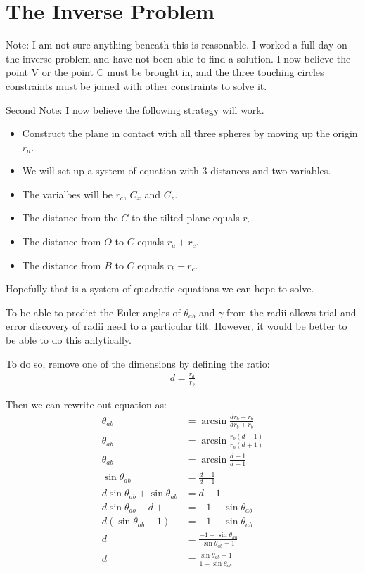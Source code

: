 \documentclass{article}
\begin{document}
\section{The Inverse Problem}

Note: I am not sure anything beneath this is reasonable.
I worked a full day on the inverse problem and have not
been able to find a solution. I now believe the point V
or the point C must be brought in, and the three touching
circles constraints must be joined with other constraints
to solve it.

Second Note: I now believe the following strategy will work.
\begin{itemize}
\item Construct the plane in contact with all three spheres
  by
  moving up the origin $r_a$.
\item We will set up a system of equation with 3 distances
  and two variables.
\item The varialbes will be $r_c$, $C_x$ and $C_z$.
\item The distance from the $C$ to the tilted plane equals $r_c$.
\item The distance from $O$ to $C$ equals $r_a + r_c$.
  \item The distance from $B$ to $C$ equals $r_b+r_c$.
\end{itemize}

Hopefully that is a system of quadratic equations we
can hope to solve.

To be able to predict the Euler angles of $\theta_{ab}$ and $\gamma$ from the radii allows trial-and-error
discovery of radii need to a particular tilt.  However, it would be better to be able to do this
anlytically.

To do so, remove one of the dimensions by defining the ratio:
\begin{align}
d = \frac{r_a}{r_b}
\end{align}

Then we can rewrite out equation as:
\begin{align}
  \theta_{ab} &= \arcsin{\frac{d r_b - r_b}{d r_b + r_b}} \\
  \theta_{ab} &= \arcsin{\frac{r_b (d  - 1)}{r_b (d  + 1)}} \\
  \theta_{ab} &= \arcsin{\frac{d - 1}{d + 1}} \\
  \sin{\theta_{ab}} &= \frac{d - 1}{d + 1} \\
  d\sin{\theta_{ab}} + \sin{\theta_{ab}} &= d-1 \\
  d\sin{\theta_{ab}} -d +  &= -1 -\sin{\theta_{ab}} \\
  d(\sin{\theta_{ab}} -1)  &= -1 -\sin{\theta_{ab}} \\
  d &= \frac{-1 -\sin{\theta_{ab}}}{\sin{\theta_{ab}} -1} \\
  d &= \frac{\sin{\theta_{ab}} + 1}{1 - \sin{\theta_{ab}}}
\end{align}
\end{document}
